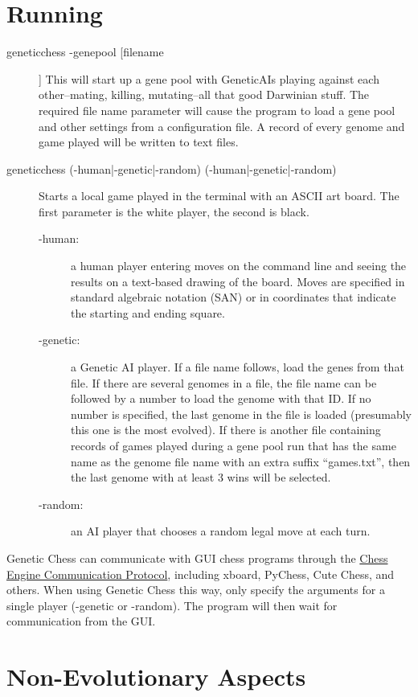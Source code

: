 \documentclass[letter]{article}
\newcommand{\code}[1]{#1}
\renewcommand\_{\textunderscore\allowbreak}
\begin{document}
\section{Running}
\label{running}
\begin{description}
	\item[\code{genetic\_chess -genepool [file\_name]}]
This will start up a gene pool with Genetic\_AIs playing against each other--mating, killing, mutating--all that good Darwinian stuff. The required file name parameter will cause the program to load a gene pool and other settings from a configuration file. A record of every genome and game played will be written to text files.

	\item[\code{genetic\_chess (-human|-genetic|-random) (-human|-genetic|-random)}]
Starts a local game played in the terminal with an ASCII art board. The first parameter is the white player, the second is black.
	\begin{description}
		\item[\code{-human}:] a human player entering moves on the command line and seeing the results on a text-based drawing of the board. Moves are specified in standard algebraic notation (SAN) or in coordinates that indicate the starting and ending square. 
		\item[\code{-genetic}:] a Genetic AI player. If a file name follows, load the genes from that file. If there are several genomes in a file, the file name can be followed by a number to load the genome with that ID. If no number is specified, the last genome in the file is loaded (presumably this one is the most evolved). If there is another file containing records of games played during a gene pool run that has the same name as the genome file name with an extra suffix ``\_games.txt'', then the last genome with at least 3 wins will be selected.
		\item[\code{-random}:] an AI player that chooses a random legal move at each turn.
	\end{description}
\end{description}
Genetic Chess can communicate with GUI chess programs through the \href{https://www.gnu.org/software/xboard/engine-intf.html}{Chess Engine Communication Protocol}, including xboard, PyChess, Cute Chess, and others. When using Genetic Chess this way, only specify the arguments for a single player (\code{-genetic} or \code{-random}). The program will then wait for communication from the GUI.


\section{Non-Evolutionary Aspects}
\end{document}

